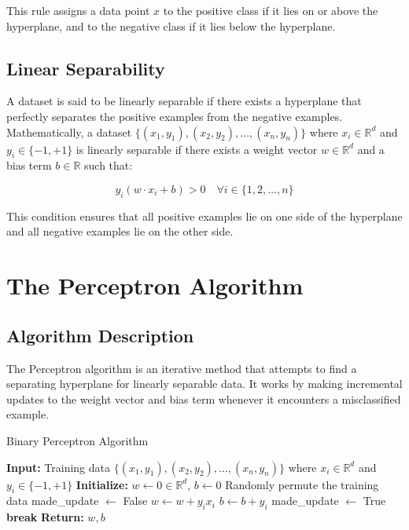 \documentclass{article}
\begin{document}
This rule assigns a data point $x$ to the positive class if it lies on or above the hyperplane, and to the negative class if it lies below the hyperplane.

\subsection{Linear Separability}

A dataset is said to be linearly separable if there exists a hyperplane that perfectly separates the positive examples from the negative examples. Mathematically, a dataset $\{(x_1, y_1), (x_2, y_2), \ldots, (x_n, y_n)\}$ where $x_i \in \mathbb{R}^d$ and $y_i \in \{-1, +1\}$ is linearly separable if there exists a weight vector $w \in \mathbb{R}^d$ and a bias term $b \in \mathbb{R}$ such that:

\begin{equation}
y_i(w \cdot x_i + b) > 0 \quad \forall i \in \{1, 2, \ldots, n\}
\end{equation}

This condition ensures that all positive examples lie on one side of the hyperplane and all negative examples lie on the other side.

\section{The Perceptron Algorithm}

\subsection{Algorithm Description}

The Perceptron algorithm is an iterative method that attempts to find a separating hyperplane for linearly separable data. It works by making incremental updates to the weight vector and bias term whenever it encounters a misclassified example.

\begin{algorithm}
\caption{Binary Perceptron Algorithm}
\begin{algorithmic}[1]
\State \textbf{Input:} Training data $\{(x_1, y_1), (x_2, y_2), \ldots, (x_n, y_n)\}$ where $x_i \in \mathbb{R}^d$ and $y_i \in \{-1, +1\}$
\State \textbf{Initialize:} $w \gets 0 \in \mathbb{R}^d$, $b \gets 0$
    \State Randomly permute the training data
    \State made\_update $\gets$ False
         
            \State $w \gets w + y_i x_i$ 
            \State $b \gets b + y_i$ 
            \State made\_update $\gets$ True
        \EndIf
    \EndFor
     
        \State \textbf{break} 
    \EndIf
\EndWhile
\State \textbf{Return:} $w, b$
\end{algorithmic}
\end{algorithm}
\end{document}
